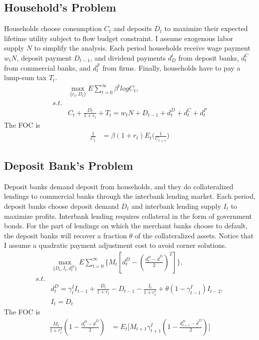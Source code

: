 \documentclass[12pt]{article}
\begin{document}
\subsection{Household's Problem}
Households choose consumption $C_t$ and deposits $D_t$ to maximize their expected lifetime utility subject to flow budget constraint. I assume exogenous labor supply $N$ to simplify the analysis.
Each period households receive wage payment $w_tN$, deposit payment $D_{t-1}$, and dividend payments $d^t_D$ from deposit banks, $d_t^C$ from commercial banks, and $d_t^F$ from firms.
Finally, households have to pay a lump-sum tax $T_t$.
\begin{align}
  &\max_{\{c_t, D_t\}} E \sum_{t=0}^{\infty} \beta^t logC_t ,\\
  s.t. \nonumber \\
  &C_t+\frac{D_t}{1+r_t}+T_t=w_tN+D_{t-1}+d_t^D+d_t^C+d_t^F
\end{align}
The FOC is 
\begin{align}
  \frac{1}{C_t}&=\beta (1+r_t)E_t\big(  \frac{1}{C_{t+1}}\big)
\end{align}


\subsection{Deposit Bank's Problem}
Deposit banks demand deposit from households, and they do collateralized lendings to commercial banks through the interbank lending market.
Each period, deposit banks choose deposit demand $D_t$ and interbank lending supply $I_t$ to maximize profits.  Interbank lending requires
collateral in the form of government bonds. For the part of lendings on which the merchant banks choose to default, the deposit banks will recover
a fraction $\theta$ of the collateralized assets. Notice that I assume a quadratic payment adjustment cost to avoid corner solutions.
\begin{align}
  &\max_{\{D_t, I_t, d_t^D\}} E \sum_{t=0}^{\infty} \{M_t[d_t^D-(\frac{d_t^D-\bar{d}^D}{2})^2]\} ,\\
  s.t. \nonumber \\
  &d_t^D=\gamma_t^I I_{t-1}+\frac{D_t}{1+r_t}-D_{t-1}-\frac{I_t}{1+r_t^I}+ \theta(1-\gamma_{t-1}^I)I_{t-2},\\
  &I_t=D_t
\end{align}
The FOC is 
\begin{align}
  \frac{M_t}{1+r_t^I}(1-\frac{d_t^D-\bar{d}^D}{2})&=E_t  \big[M_{t+1}\gamma_{t+1}^I (1-\frac{d_{t+1}^D-\bar{d}^D}{2})\big]
\end{align}
\end{document}
